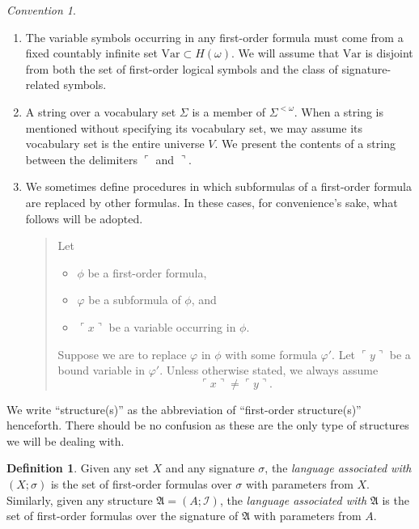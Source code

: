 \documentclass[12pt, twoside]{memoir}
\numberwithin{equation}{section}
\theoremstyle{definition}
\newtheorem{defi}[thm]{Definition}
\theoremstyle{remark}
\newtheorem{con}[thm]{Convention}
\theoremstyle{definition}
\theoremstyle{definition}
\theoremstyle{definition}
\theoremstyle{remark}
\begin{document}
\begin{con}
\begin{enumerate}[label=(\arabic*)]
    In contexts where the correspondence between a signature and its interpretation is clear, we might write $(A; \mathcal{I})$ as $(A; \Vec{S})$, where $\Vec{S}$ is some ordering of $ran(\mathcal{I})$.
    \item\label{224} The variable symbols occurring in any first-order formula must come from a fixed countably infinite set $\mathrm{Var} \subset H(\omega)$. We will assume that $\mathrm{Var}$ is disjoint from both the set of first-order logical symbols and the class of signature-related symbols.
    \item A string over a vocabulary set $\Sigma$ is a member of $\Sigma^{< \omega}$. When a string is mentioned without specifying its vocabulary set, we may assume its vocabulary set is the entire universe $V$. We present the contents of a string between the delimiters $\ulcorner$ and $\urcorner$.
    \item We sometimes define procedures in which subformulas of a first-order formula are replaced by other formulas. In these cases, for convenience's sake, what follows will be adopted.
    \begin{quote}
        Let 
        \begin{itemize}
            \item $\phi$ be a first-order formula, 
            \item $\varphi$ be a subformula of $\phi$, and
            \item $\ulcorner x \urcorner$ be a variable occurring in $\phi$.
        \end{itemize}
        Suppose we are to replace $\varphi$ in $\phi$ with some formula $\varphi'$. Let $\ulcorner y \urcorner$ be a bound variable in $\varphi'$. Unless otherwise stated, we always assume $$\ulcorner x \urcorner \neq \ulcorner y \urcorner \text{.}$$        
    \end{quote}
\end{enumerate}
\end{con}

We write ``structure(s)'' as the abbreviation of ``first-order structure(s)'' henceforth. There should be no confusion as these are the only type of structures we will be dealing with.

\begin{defi}
Given any set $X$ and any signature $\sigma$, the \emph{language associated with} $(X; \sigma)$ is the set of first-order formulas over $\sigma$ with parameters from $X$. Similarly, given any structure $\mathfrak{A} = (A; \mathcal{I})$, the \emph{language associated with} $\mathfrak{A}$ is the set of first-order formulas over the signature of $\mathfrak{A}$ with parameters from $A$.
\end{defi}
\end{document}
